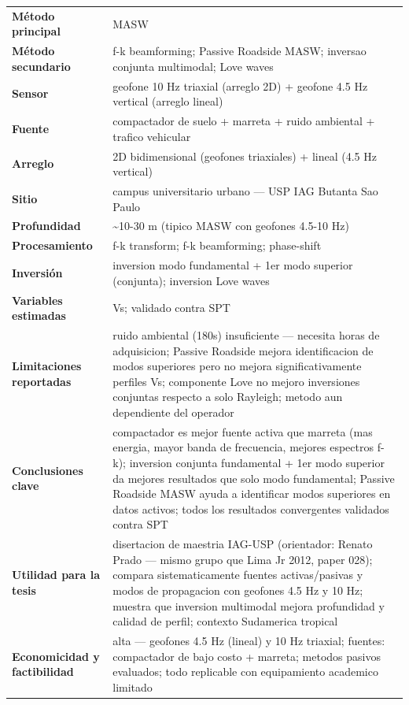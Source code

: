 \begin{center}\scriptsize
\begin{tabularx}{\textwidth}{@{}>{\bfseries}p{3.3cm} X@{}}
\toprule
M\'etodo principal & MASW \\
M\'etodo secundario & f-k beamforming; Passive Roadside MASW; inversao conjunta multimodal; Love waves \\
Sensor & geofone 10 Hz triaxial (arreglo 2D) + geofone 4.5 Hz vertical (arreglo lineal) \\
Fuente & compactador de suelo + marreta + ruido ambiental + trafico vehicular \\
Arreglo & 2D bidimensional (geofones triaxiales) + lineal (4.5 Hz vertical) \\
Sitio & campus universitario urbano --- USP IAG Butanta Sao Paulo \\
Profundidad & \textasciitilde{}10-30 m (tipico MASW con geofones 4.5-10 Hz) \\
Procesamiento & f-k transform; f-k beamforming; phase-shift \\
Inversi\'on & inversion modo fundamental + 1er modo superior (conjunta); inversion Love waves \\
Variables estimadas & Vs; validado contra SPT \\
Limitaciones reportadas & ruido ambiental (180s) insuficiente --- necesita horas de adquisicion; Passive Roadside mejora identificacion de modos superiores pero no mejora significativamente perfiles Vs; componente Love no mejoro inversiones conjuntas respecto a solo Rayleigh; metodo aun dependiente del operador \\
Conclusiones clave & compactador es mejor fuente activa que marreta (mas energia, mayor banda de frecuencia, mejores espectros f-k); inversion conjunta fundamental + 1er modo superior da mejores resultados que solo modo fundamental; Passive Roadside MASW ayuda a identificar modos superiores en datos activos; todos los resultados convergentes validados contra SPT \\
Utilidad para la tesis & disertacion de maestria IAG-USP (orientador: Renato Prado --- mismo grupo que Lima Jr 2012, paper 028); compara sistematicamente fuentes activas/pasivas y modos de propagacion con geofones 4.5 Hz y 10 Hz; muestra que inversion multimodal mejora profundidad y calidad de perfil; contexto Sudamerica tropical \\
Economicidad y factibilidad & alta --- geofones 4.5 Hz (lineal) y 10 Hz triaxial; fuentes: compactador de bajo costo + marreta; metodos pasivos evaluados; todo replicable con equipamiento academico limitado \\
\bottomrule
\end{tabularx}
\end{center}

